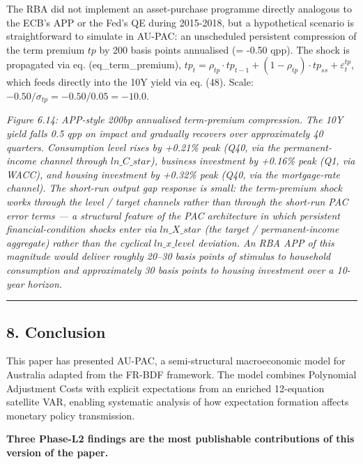 \documentclass[
]{article}
\begin{document}
The RBA did not implement an asset-purchase programme directly analogous
to the ECB's APP or the Fed's QE during 2015-2018, but a hypothetical
scenario is straightforward to simulate in AU-PAC: an unscheduled
persistent compression of the term premium \(tp\) by 200 basis points
annualised (= -0.50 qpp). The shock is propagated via eq.
(eq\_term\_premium),
\(tp_t = \rho_{tp} \cdot tp_{t-1} + (1-\rho_{tp}) \cdot tp_{ss} + \varepsilon^{tp}_t\),
which feeds directly into the 10Y yield via eq. (48). Scale:
\(-0.50 / \sigma_{tp} = -0.50/0.05 = -10.0\).

\emph{Figure 6.14: APP-style 200bp annualised term-premium compression.
The 10Y yield falls 0.5 qpp on impact and gradually recovers over
approximately 40 quarters. Consumption level rises by +0.21\% peak (Q40,
via the permanent-income channel through \(ln\_C\_star\)), business
investment by +0.16\% peak (Q1, via WACC), and housing investment by
+0.32\% peak (Q40, via the mortgage-rate channel). The short-run output
gap response is small: the term-premium shock works through the level /
target channels rather than through the short-run PAC error terms --- a
structural feature of the PAC architecture in which persistent
financial-condition shocks enter via \(ln\_X\_star\) (the target /
permanent-income aggregate) rather than the cyclical \(ln\_x\_level\)
deviation. An RBA APP of this magnitude would deliver roughly 20--30
basis points of stimulus to household consumption and approximately 30
basis points to housing investment over a 10-year horizon.}

\begin{center}\rule{0.5\linewidth}{0.5pt}\end{center}

\subsection{8. Conclusion}\label{conclusion}

This paper has presented AU-PAC, a semi-structural macroeconomic model
for Australia adapted from the FR-BDF framework. The model combines
Polynomial Adjustment Costs with explicit expectations from an enriched
12-equation satellite VAR, enabling systematic analysis of how
expectation formation affects monetary policy transmission.

\textbf{Three Phase-L2 findings are the most publishable contributions
of this version of the paper.}
\end{document}
